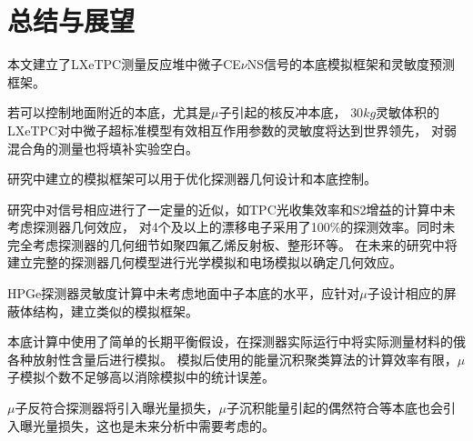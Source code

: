 
\chapter{总结与展望}

本文建立了LXeTPC测量反应堆中微子CE$\nu$NS信号的本底模拟框架和灵敏度预测框架。

若可以控制地面附近的本底，尤其是$\mu$子引起的核反冲本底，
$30\si{kg}$灵敏体积的LXeTPC对中微子超标准模型有效相互作用参数的灵敏度将达到世界领先，
对弱混合角的测量也将填补实验空白。

研究中建立的模拟框架可以用于优化探测器几何设计和本底控制。

研究中对信号相应进行了一定量的近似，如TPC光收集效率和$\mathrm{S2}$增益的计算中未考虑探测器几何效应，
对4个及以上的漂移电子采用了100\%的探测效率。同时未完全考虑探测器的几何细节如聚四氟乙烯反射板、整形环等。
在未来的研究中将建立完整的探测器几何模型进行光学模拟和电场模拟以确定几何效应。

HPGe探测器灵敏度计算中未考虑地面中子本底的水平，应针对$\mu$子设计相应的屏蔽体结构，建立类似的模拟框架。

本底计算中使用了简单的长期平衡假设，在探测器实际运行中将实际测量材料的俄各种放射性含量后进行模拟。
模拟后使用的能量沉积聚类算法的计算效率有限，$\mu$子模拟个数不足够高以消除模拟中的统计误差。

$\mu$子反符合探测器将引入曝光量损失，$\mu$子沉积能量引起的偶然符合等本底也会引入曝光量损失，这也是未来分析中需要考虑的。
